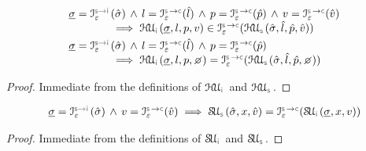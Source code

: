 \begin{lemma}\label{lemma:soundiness:heap:update}
$$
\begin{array}{l}
\istate = \interpret{\symbinst}{\senv}(\sstate) \, \wedge \, 
   \loc = \interpret{\symbconc}{\senv}(\sloc)  \, \wedge \, 
   p = \interpret{\symbconc}{\senv}(\sexprp)  \, \wedge \, 
   \val = \interpret{\symbconc}{\senv}(\sexprv)   \\  \qquad \qquad
       \implies \hpupdt{\instrumented}(\istate, \loc, p, \val) \in \interpret{\symbconc}{\senv}(\hpupdt{\symbolic}(\sstate, \sloc, \sexprp, \sexprv)) \\[3pt]
%       
\istate = \interpret{\symbinst}{\senv}(\sstate) \, \wedge \, 
   \loc = \interpret{\symbconc}{\senv}(\sloc)  \, \wedge \, 
   p = \interpret{\symbconc}{\senv}(\sexprp) \\  \qquad \qquad
  \implies \hpupdt{\instrumented}(\istate, \loc, p, \none) = \interpret{\symbconc}{\senv}(\hpupdt{\symbolic}(\sstate, \sloc, \sexprp, \none)) 
\end{array}
$$
\end{lemma}
\begin{proof}
Immediate from the definitions of $\hpupdt{\instrumented}$ and $\hpupdt{\symbolic}$.
\end{proof}


\begin{lemma}\label{lemma:soundiness:store:update}
$$
\begin{array}{l}
\istate = \interpret{\symbinst}{\senv}(\sstate) \, \wedge \, 
   \val = \interpret{\symbconc}{\senv}(\sexprv)   
       \implies \stupdt{\symbolic}(\sstate, \jvar, \sexprv) = \interpret{\symbconc}{\senv}(\stupdt{\instrumented}(\istate, \jvar, \val)) 
\end{array}
$$
\end{lemma}
\begin{proof}
Immediate from the definitions of $\stupdt{\instrumented}$ and $\stupdt{\symbolic}$.
\end{proof}


